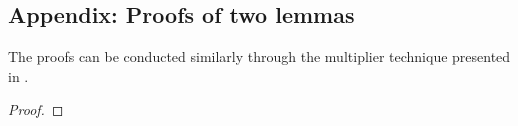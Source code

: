 \documentclass[review]{elsarticle}
\newenvironment{1proofof}[1]{%
  \renewcommand{\proofname}{I. Proof of #1}%
  \begin{proof}%
}{%
  \end{proof}%
}
\numberwithin{equation}{section}
\begin{document}
\begin{appendices}

  \renewcommand{\thesection}{}
  \titleformat{\section}[block]{\Large\bfseries}{\thesection}{0em}{}
  \renewcommand{\theequation}{A.\arabic{equation}}
\section{Appendix: Proofs of two lemmas}
The proofs can be conducted similarly through the multiplier technique presented in \cite[Section 3.1]{S}.

\begin{1proofof}{Lemma \ref{energy-estimatet}}


\end{1proofof}
\end{appendices}
\end{document}
